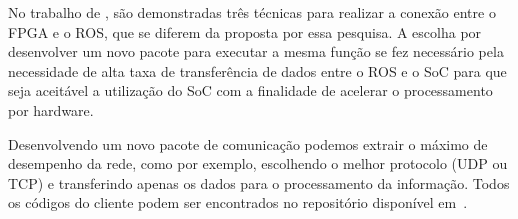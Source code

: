 No trabalho de , são demonstradas três técnicas para realizar a conexão entre o FPGA e o ROS, que se diferem da proposta por essa pesquisa. A escolha por desenvolver um novo pacote para executar a mesma função se fez necessário pela necessidade de alta taxa de transferência de dados entre o ROS e o SoC para que seja aceitável a utilização do SoC com a finalidade de acelerar o processamento por hardware. 

Desenvolvendo um novo pacote de comunicação podemos extrair o máximo de desempenho da rede, como por  exemplo, escolhendo o melhor protocolo (UDP ou TCP) e transferindo apenas os dados para o processamento da informação. Todos os códigos do cliente podem ser encontrados no repositório disponível em~\cite{interface-socket}.
